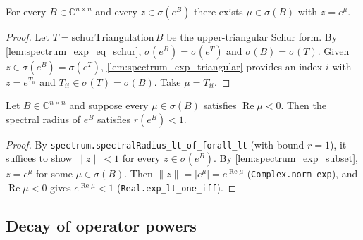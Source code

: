 \begin{lemma}
    \label{lem:spectrum_exp_subset}
    \leanok
    For every $B \in \mathbb{C}^{n \times n}$ and every $z \in \sigma(e^{B})$
    there exists $\mu \in \sigma(B)$ with $z = e^{\mu}$.
\end{lemma}
\begin{proof}
    Let $T = \mathrm{schurTriangulation}\,B$ be the upper-triangular Schur form.
    By \cref{lem:spectrum_exp_eq_schur}, $\sigma(e^{B}) = \sigma(e^{T})$ and
    $\sigma(B) = \sigma(T)$. Given $z \in \sigma(e^{B}) = \sigma(e^{T})$,
    \cref{lem:spectrum_exp_triangular} provides an index $i$ with $z = e^{T_{ii}}$
    and $T_{ii} \in \sigma(T) = \sigma(B)$. Take $\mu = T_{ii}$.
\end{proof}

\begin{lemma}
    \label{lem:spectralRadius_exp_lt_one}
    \leanok
    Let $B \in \mathbb{C}^{n \times n}$ and suppose every $\mu \in \sigma(B)$
    satisfies $\operatorname{Re}\mu < 0$. Then the spectral radius of $e^{B}$
    satisfies $r(e^{B}) < 1$.
\end{lemma}
\begin{proof}
    By \texttt{spectrum.spectralRadius\_lt\_of\_forall\_lt} (with bound $r = 1$),
    it suffices to show $\|z\| < 1$ for every $z \in \sigma(e^{B})$. By
    \cref{lem:spectrum_exp_subset}, $z = e^{\mu}$ for some $\mu \in \sigma(B)$.
    Then $\|z\| = |e^{\mu}| = e^{\operatorname{Re}\mu}$
    (\texttt{Complex.norm\_exp}), and $\operatorname{Re}\mu < 0$ gives
    $e^{\operatorname{Re}\mu} < 1$ (\texttt{Real.exp\_lt\_one\_iff}).
\end{proof}

\subsection{Decay of operator powers}

